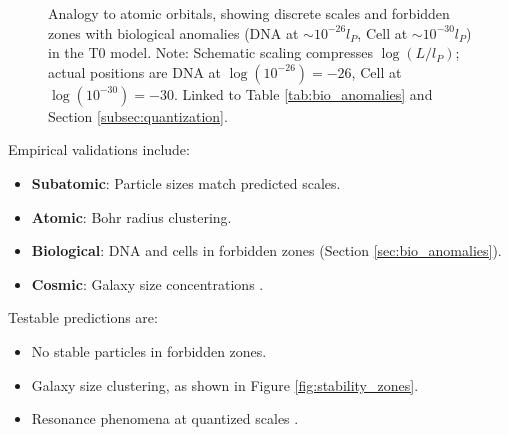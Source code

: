 \documentclass[12pt,a4paper]{article}
\begin{document}
	\begin{figure}[htbp]
		\centering
		\caption{Analogy to atomic orbitals, showing discrete scales and forbidden zones with biological anomalies (DNA at \(\sim 10^{-26} l_P\), Cell at \(\sim 10^{-30} l_P\)) in the T0 model. Note: Schematic scaling compresses \(\log(L/l_P)\); actual positions are DNA at \(\log(10^{-26}) = -26\), Cell at \(\log(10^{-30}) = -30\). Linked to Table \ref{tab:bio_anomalies} and Section \ref{subsec:quantization}.}
		\label{fig:orbital_analogy}
	\end{figure}
	
	Empirical validations include:
	\begin{itemize}
		\item \textbf{Subatomic}: Particle sizes match predicted scales.
		\item \textbf{Atomic}: Bohr radius clustering.
		\item \textbf{Biological}: DNA and cells in forbidden zones (Section \ref{sec:bio_anomalies}).
		\item \textbf{Cosmic}: Galaxy size concentrations \cite{pascher_galaxies_2025}.
	\end{itemize}
	
	Testable predictions are:
	\begin{itemize}
		\item No stable particles in forbidden zones.
		\item Galaxy size clustering, as shown in Figure \ref{fig:stability_zones}.
		\item Resonance phenomena at quantized scales \cite{pascher_quantum_2025}.
	\end{itemize}
	
\end{document}
